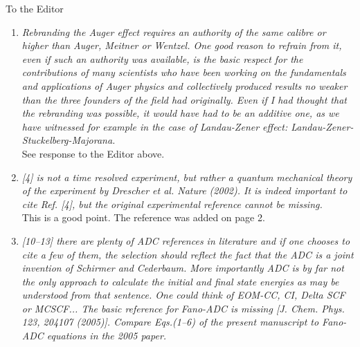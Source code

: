 \documentclass[DIN,pagenumber=false,parskip=half,fromalign=left,fromphone=false,fromemail=true,fromurl=false,fromlogo=false,fromrule=false]{scrlttr2}
\begin{document}
\begin{letter}{To the Editor}
\begin{enumerate}
       Coster-Kronig decay width data for primary
       $L$ and $M$ shell ionization. They are given in the tables
       III--V of the revised manuscript.
       The inspection of this data shows that the rule of thumb that I
       formulated based on my calculations and their analysis holds in all cases but one.
       I have thereby both significantly extended the manuscript to fit the proposed
       goal.
       Details are discussed in the manuscript on pages 12--14 .\\
       I have included a description of the (super-)Coster-Kronig process and
       clarified that I differentiate between Auger-Meitner processes on pages 4--5.
 \item \emph{Rebranding the Auger effect requires an authority of the same calibre
       or higher than Auger, Meitner or Wentzel. One good reason to refrain from it,
       even if such an authority was available, is the basic respect for the contributions
       of many scientists who have been working on the fundamentals and applications
       of Auger physics and collectively produced results no weaker than the three
       founders of the field had originally. Even if I had thought that the rebranding
       was possible, it would have had to be an additive one, as we have witnessed
       for example in the case of Landau-Zener effect: Landau-Zener-Stuckelberg-Majorana.}\\
       See response to the Editor above.
 \item \emph{[4] is not a time resolved experiment, but rather a quantum mechanical
       theory of the experiment by Drescher et al. Nature (2002). It is indeed important
       to cite Ref. [4], but the original experimental reference cannot be missing.}\\
       This is a good point. The reference was added on page 2.
 \item \emph{[10--13] there are plenty of ADC references in literature and if one
       chooses to cite a few of them, the selection should reflect the fact that the
       ADC is a joint invention of Schirmer and Cederbaum. More importantly ADC is
       by far not the only approach to calculate the initial and final state energies
       as may be understood from that sentence. One could think of EOM-CC, CI, Delta SCF
       or MCSCF... The basic reference for Fano-ADC is missing
       [J. Chem. Phys. 123, 204107 (2005)]. Compare Eqs.(1--6) of the present manuscript
       to Fano-ADC equations in the 2005 paper.}\\

\end{enumerate}
\end{letter}
\end{document}
